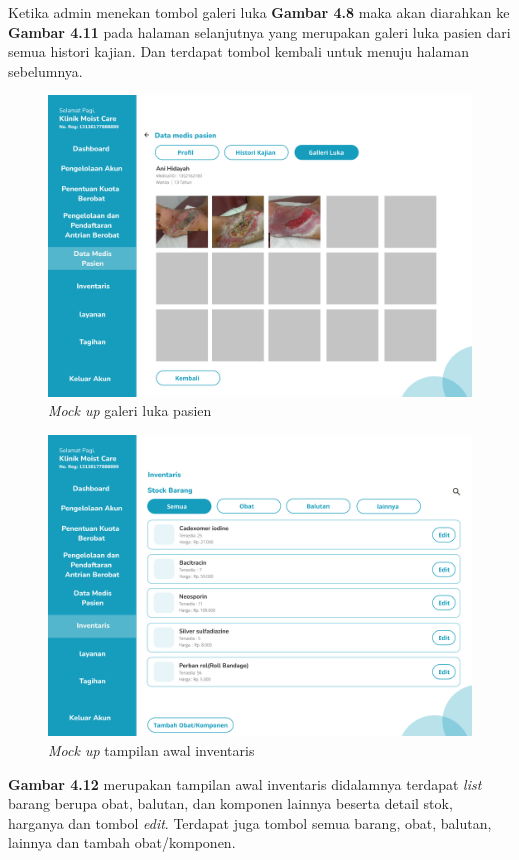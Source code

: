 \begin{enumerate}
	Ketika admin menekan tombol galeri luka \textbf{Gambar 4.8} maka akan diarahkan ke \textbf{Gambar 4.11} pada halaman selanjutnya yang merupakan galeri luka pasien dari semua histori kajian. Dan terdapat tombol kembali untuk menuju halaman sebelumnya.
	
	\begin{figure}[H]
		\centering
		\includegraphics[width=12cm]{gambar/mockup_web/Proses Pengobatan 5.png}
		\caption{\emph{Mock up} galeri luka pasien}
		\label{Gambar:pengelolaanantrian2}
	\end{figure}
	
	\begin{figure}[H]
		\centering
		\includegraphics[width=12cm]{gambar/mockup_web/Inventaris1.png}
		\caption{\emph{Mock up} tampilan awal inventaris}
		\label{Gambar:pengelolaanantrian2}
	\end{figure}
	
	\textbf{Gambar 4.12} merupakan tampilan awal inventaris didalamnya terdapat \emph{list} barang berupa obat, balutan, dan komponen lainnya beserta detail stok, harganya dan tombol \emph{edit}. Terdapat juga tombol semua barang, obat, balutan, lainnya dan tambah obat/komponen.
	

\end{enumerate}
